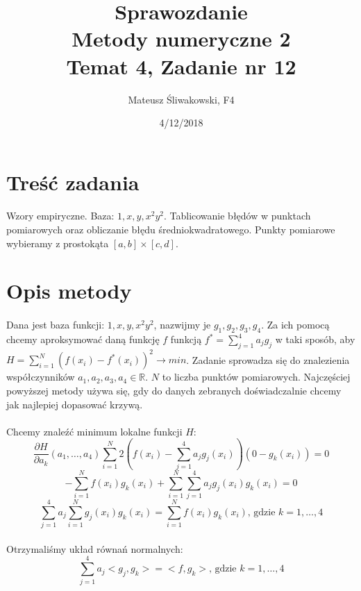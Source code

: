 \documentclass{article}
\title{Sprawozdanie \\Metody numeryczne 2 \\\textbf{Temat 4, Zadanie nr 12}}
\date{4/12/2018}
\author{Mateusz Śliwakowski, F4}
\begin{document}
  \maketitle
 	  \newpage

\section{Treść zadania}
\paragraph{}
Wzory empiryczne. Baza: $1,x,y,x^2y^2$. Tablicowanie błędów w punktach pomiarowych oraz obliczanie błędu średniokwadratowego. Punkty pomiarowe wybieramy z prostokąta $[a,b]\times[c,d]$.
\section{Opis metody}
\paragraph{}
Dana jest baza funkcji: $1,x,y,x^2y^2$, nazwijmy je $g_1,g_2,g_3,g_4$. Za ich pomocą chcemy aproksymować daną funkcję $f$ funkcją $f^*=\sum_{j=1}^4a_jg_j$ w taki sposób, aby $H = \sum_{i=1}^N(f(x_i)-f^*(x_i))^2 \longrightarrow min$. Zadanie sprowadza się do znalezienia współczynników $a_1, a_2, a_3, a_4\in \mathbb{R}$. $N$ to liczba punktów pomiarowych. Najczęściej powyższej metody używa się, gdy do danych zebranych doświadczalnie chcemy jak najlepiej dopasować krzywą.
\paragraph{}
Chcemy znaleźć minimum lokalne funkcji $H$:
$$\frac{\partial H}{\partial a_k}(a_1,\dots,a_4)\sum_{i=1}^N2(f(x_i)-\sum_{j=1}^4a_jg_j(x_i))(0 - g_k(x_i)) = 0$$
$$-\sum_{i=1}^Nf(x_i)g_k(x_i)+\sum_{i=1}^N\sum_{j=1}^4a_jg_j(x_i)g_k(x_i)=0$$
$$\sum_{j=1}^4a_j\sum_{i=1}^Ng_j(x_i)g_k(x_i) = \sum_{i=1}^Nf(x_i)g_k(x_i)\text{, gdzie } k = 1,\dots,4$$
\paragraph{}
Otrzymaliśmy układ równań normalnych:
$$\sum_{j=1}^4a_j<g_j,g_k>=<f,g_k>\text{, gdzie }k=1,\dots,4$$
\end{document}
